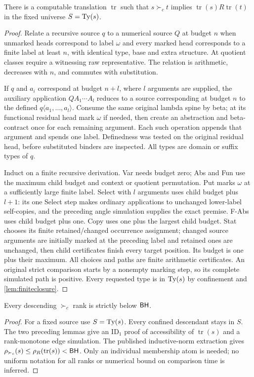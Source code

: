 \documentclass[11pt,a4paper]{article}
\newcommand{\rk}{\rho}
\newcommand{\ang}[2]{#1\langle #2\rangle}
\begin{document}
\begin{lemma}\label{lem:simulation}
There is a computable translation $\operatorname{tr}$ such that
$s\succ_ct$ implies $\operatorname{tr}(s)R\operatorname{tr}(t)$ in the
fixed universe $S=\operatorname{Ty}(s)$.
\end{lemma}
\begin{proof}
Relate a recursive source $q$ to a numerical source $Q$ at budget $n$ when
unmarked heads correspond to label $\omega$ and every marked head corresponds
to a finite label at least $n$, with identical type, base and extra structure.
At quotient classes require a witnessing raw representative.  The relation
is arithmetic, decreases with $n$, and commutes with substitution.

If $q$ and $a_i$ correspond at budget $n+l$, where $l$ arguments are supplied,
the auxiliary application $QA_1\cdots A_l$ reduces to a source corresponding
at budget $n$ to the defined $\ang q{a_1,\ldots,a_l}$.  Consume the same original
lambda spine by beta; at its functional residual head mark $\omega$ if needed,
then create an abstraction and beta-contract once for each remaining argument.
Each such operation appends that argument and spends one label.  Definedness
was tested on the original residual head, before substituted binders are
inspected.  All types are domain or suffix types of $q$.

Induct on a finite recursive derivation.  Var needs budget zero; Abs and Fun
use the maximum child budget and context or quotient permutation.  Put marks
$\omega$ at a sufficiently large finite label.  Select with $l$ arguments uses
child budget plus $l+1$: its one Select step makes ordinary applications to
unchanged lower-label self-copies, and the preceding angle simulation supplies
the exact premise.  F-Abs uses child budget plus one.  Copy uses one plus the
largest child budget.  Stat chooses its finite retained/changed occurrence
assignment; changed source arguments are initially marked at the preceding
label and retained ones are unchanged, then child certificates finish every
target position.  Its budget is one plus their maximum.  All choices and
paths are finite arithmetic certificates.  An original strict comparison
starts by a nonempty marking step, so its complete simulated path is positive.
Every requested type is in $\operatorname{Ty}(s)$ by confinement and \ref{lem:finiteclosure}.
\end{proof}

\begin{theorem}\label{thm:upper}
Every descending $\succ_c$ rank is strictly below $\mathsf{BH}$.
\end{theorem}
\begin{proof}
For a fixed source use $S=\operatorname{Ty}(s)$.  Every confined descendant stays in $S$.
The two preceding lemmas give an $\mathrm{ID}_1$ proof of accessibility of
$\operatorname{tr}(s)$ and a rank-monotone edge simulation.  The published
inductive-norm extraction gives
$\rk_{\succ_c}(s)\le\rk_R(\operatorname{tr}(s))<\BH$.
Only an individual membership atom is needed; no uniform notation for all
ranks or numerical bound on comparison time is inferred.
\end{proof}
\end{document}
